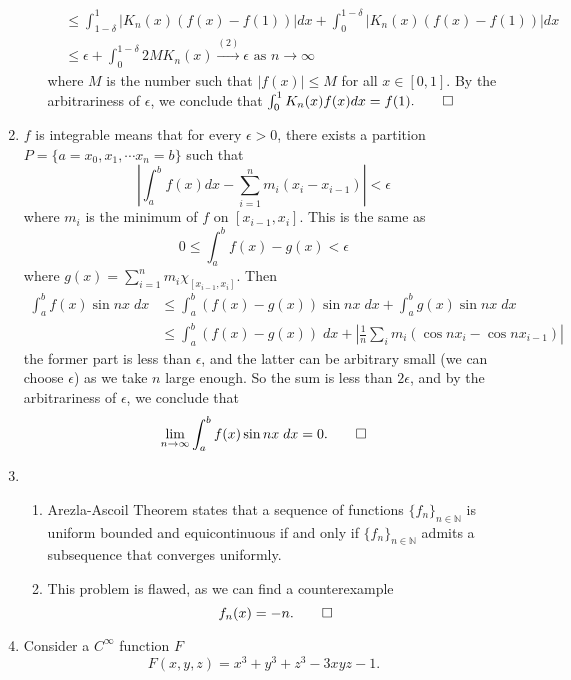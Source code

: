 \begin{enumerate}
\begin{enumerate}
\begin{align*}
            &\leq \int^1_{1-\delta} |K_n(x) (f(x) -  f(1))| dx + \int^{1-\delta}_0 |K_n(x) (f(x) -  f(1))| dx \\
            &\leq \epsilon + \int^{1-\delta}_0 2M K_n(x) \overset{(2)}{\to} \epsilon \text{ as } n \to \infty
            \end{align*}
            where $M$ is the number such that $|f(x)| \leq M$ for all $x \in [0,1]$. By the arbitrariness of $\epsilon$, we conclude that $\int^1_0 K_n(x) f(x) dx = f(1). \qed$
        \end{enumerate}
        \item 
        $f$ is integrable means that for every $\epsilon > 0$, there exists a partition $P = \{a=x_0, x_1, \cdots x_n = b\}$ such that
        \[
        \left\vert \int_a^b f(x)dx - \sum_{i=1}^n m_i (x_i - x_{i-1}) \right\vert < \epsilon
        \]
        where $m_i$ is the minimum of $f$ on $[x_{i-1}, x_i]$. This is the same as 
        \[
        0 \leq \int_a^b f(x) - g(x) < \epsilon	
        \]
        where $g(x) = \sum_{i=1}^n m_i \chi_{[x_{i-1}, x_i]}.$ Then 
        \begin{align*}
        \int_a^b f(x) \sin nx \; dx &\leq \int_a^b (f(x) - g(x)) \sin nx\; dx + \int_a^b g(x) \sin nx \;dx \\
        &\leq \int_a^b (f(x) - g(x))\;dx + \left\vert \frac{1}{n} \sum_i m_i (\cos n x_i - \cos n x_{i-1} ) \right\vert
        \end{align*}
        the former part is less than $\epsilon$, and the latter can be arbitrary small (we can choose $\epsilon$) as we take $n$ large enough. So the sum is less than $2\epsilon$, and by the arbitrariness of $\epsilon$, we conclude that
        \[
        \lim_{n \to \infty} \int_a^b f(x) \sin nx \; dx = 0. \qed
        \]
        \item 
        \begin{enumerate}
            \item Arezla-Ascoil Theorem states that a sequence of functions $\{f_n\}_{n \in \mathbb{N}}$ is uniform bounded and equicontinuous if and only if $\{f_n\}_{n \in \mathbb{N}}$ admits a subsequence that converges uniformly.
            \item This problem is flawed, as we can find a counterexample
            \[
                f_n(x) = -n. \qed
            \]
        \end{enumerate}
        \item Consider a $C^\infty$ function $F$
        \[
        F(x,y,z) = x^3+y^3+z^3-3xyz-1.
        \]

\end{enumerate}
